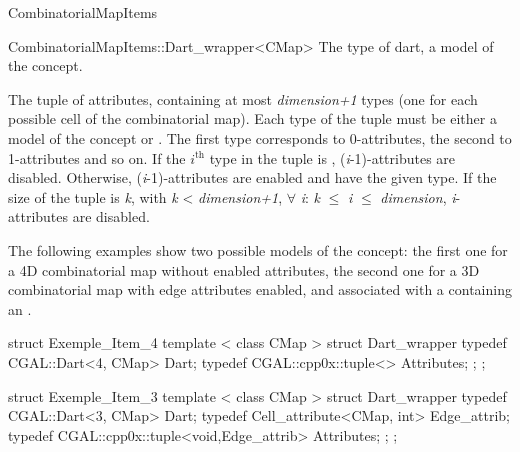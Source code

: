 \begin{ccRefConcept}{CombinatorialMapItems}
\begin{ccClass}{CombinatorialMapItems::Dart_wrapper<CMap>}
    {The type of dart, a model of the  concept.}

{The tuple of attributes, containing at most
  \emph{dimension+1} types (one for each possible cell of the combinatorial
  map).  Each type of the tuple must be either a model of the
   concept or .
  The first type corresponds to 0-attributes, 
  the second to 1-attributes and so on. 
  If the $i^{\mbox{th}}$ type in the tuple is , 
  (\emph{i}-1)-attributes are disabled. Otherwise, (\emph{i}-1)-attributes are enabled and
  have the given type.  If the size of the tuple is \emph{k},
  with \emph{k} < \emph{dimension+1}, $\forall$ \emph{i}: \emph{k} $\leq$ \emph{i} $\leq$ \emph{dimension},
  \emph{i}-attributes are disabled.}
\end{ccClass}

\ccExample
The following examples show two possible models of the
 concept: the first one for a 4D
combinatorial map without enabled attributes, the second one for a 3D
combinatorial map with edge attributes enabled, and associated with a
 containing an .

\begin{ccExampleCode}
struct Exemple_Item_4
{
   template < class CMap >
   struct Dart_wrapper
   {
     typedef CGAL::Dart<4, CMap> Dart;
     typedef CGAL::cpp0x::tuple<> Attributes;
   };
};
\end{ccExampleCode}

\begin{ccExampleCode}
struct Exemple_Item_3
{
   template < class CMap >
   struct Dart_wrapper
   {
     typedef CGAL::Dart<3, CMap> Dart;
     typedef Cell_attribute<CMap, int> Edge_attrib;
     typedef CGAL::cpp0x::tuple<void,Edge_attrib> Attributes;
   };
};
\end{ccExampleCode}    

\ccHasModels
{}

\ccSeeAlso
\\

\end{ccRefConcept}
\ccRefPageEnd

